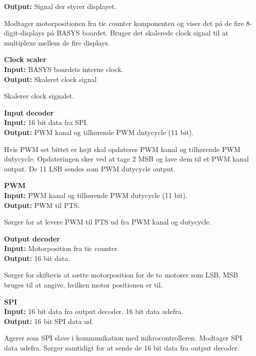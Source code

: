 \textbf{Output:} Signal der styrer displayet.

Modtager motorpositionen fra tic counter komponenten og viser det på de fire 8-digit-displays 
på BASYS boardet. Bruger det skalerede clock signal til at multiplexe mellem de 
fire displays.

\textbf{Clock scaler}\\
\textbf{Input:} BASYS boardets interne clock.\\
\textbf{Output:} Skaleret clock signal

Skalerer clock signalet.

\textbf{Input decoder}\\
\textbf{Input:} 16 bit data fra SPI.\\
\textbf{Output:} PWM kanal og tilhørende PWM dutycycle (11 bit).

Hvis PWM set bittet er højt skal opdateres PWM kanal og tilhørende PWM dutycycle.
Opdateringen sker ved at tage 2 MSB og lave dem til et PWM kanal output. De 11 
LSB sendes som PWM dutycycle output.

\textbf{PWM}\\
\textbf{Input:} PWM kanal og tilhørende PWM dutycycle (11 bit).\\
\textbf{Output:} PWM til PTS.

Sørger for at levere PWM til PTS ud fra PWM kanal og dutycycle.

\textbf{Output decoder}\\
\textbf{Input:} Motorposition fra tic counter.\\
\textbf{Output:} 16 bit data.

Sørger for skiftevis at sætte motorposition for de to motorer som LSB.
MSB bruges til at angive, hvilken motor positionen er til.

\textbf{SPI}\\
\textbf{Input:} 16 bit data fra output decoder. 16 bit data udefra.\\
\textbf{Output:} 16 bit SPI data ud.

Agerer som SPI slave i kommunikation med mikrocontrolleren.
Modtager SPI data udefra. Sørger samtidigt for at sende de 16 bit data fra output decoder.


